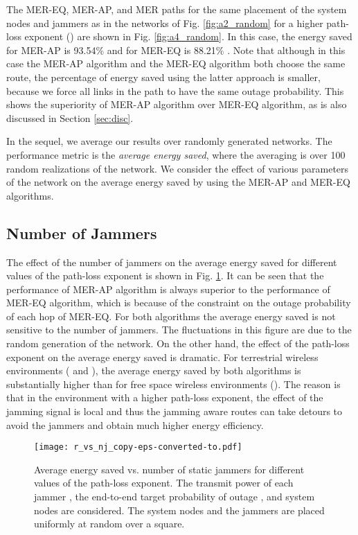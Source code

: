 \documentclass[10pt,journal]{IEEEtran}
\theoremstyle{definition}
\begin{document}
The MER-EQ, MER-AP, and MER paths for the same placement of the system nodes and jammers as in the   networks of Fig. \ref{fig:a2_random} for a higher path-loss exponent () are shown in Fig. \ref{fig:a4_random}. In this case, the  energy saved  for MER-AP  is 93.54\% and for MER-EQ is 88.21\% . 
Note that although in this case the MER-AP algorithm and the MER-EQ algorithm both choose the same route, the percentage of energy saved using the latter approach is smaller, because we force all links in the path to have the same outage probability.
This shows the superiority of MER-AP algorithm over MER-EQ algorithm, as is also discussed in Section \ref{sec:disc}.


 In the sequel, we average our results over  randomly generated networks. The performance metric is the \textit{average energy saved}, where the averaging is over 100 random realizations of the network.
We consider the effect of various parameters of the network on the average energy saved by using the MER-AP and MER-EQ algorithms. 
\subsection{Number of Jammers}
The effect of the number of  jammers on the average energy saved for different values of the path-loss exponent is shown in Fig. \ref{fig:r_vs_nj}.
It can be seen that the performance of MER-AP algorithm is always superior to the performance of MER-EQ algorithm, which is because of the  constraint on the outage probability of each hop of MER-EQ.
For both algorithms the average energy saved is not sensitive to  the number of jammers. The fluctuations in this figure are due to the random generation of the network.
On the other hand, the effect of the path-loss exponent on the average energy saved is dramatic. For terrestrial wireless environments ( and ), the average energy saved by both algorithms is substantially higher than for free space wireless environments ().
The reason is that in the  environment with a higher path-loss exponent, the effect of the jamming signal is  local and thus  the jamming aware routes can take detours to avoid the jammers and obtain much higher energy efficiency.

\begin{figure}[t]
\begin{center}
 \texttt{[image: r\_vs\_nj\_copy-eps-converted-to.pdf]}
 \end{center}
 \vspace{-.1 in}
 \caption{Average energy saved vs. number of static jammers for different values of the path-loss exponent. The transmit power of each jammer , the end-to-end target probability of outage , and  system nodes are considered. The system nodes and the jammers are placed uniformly at random over a  square. }
 \label{fig:r_vs_nj}
 \end{figure}
\end{document}
